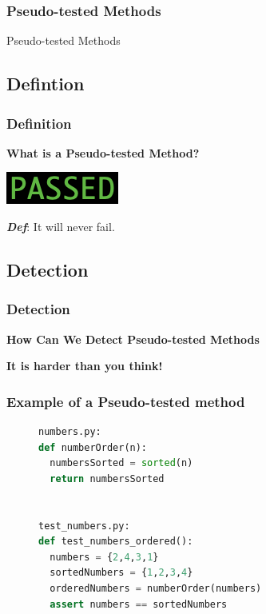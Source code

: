 \begin{frame}
	\frametitle{Pseudo-tested Methods}
	\begin{center}
    \huge{Pseudo-tested Methods}
  \end{center}
\end{frame}

\subsection{Defintion}
\begin{frame}
  \frametitle{Definition}
    \begin{center}
      \textbf{What is a Pseudo-tested Method?}

      \vspace{10mm}
      \includegraphics{images/passing}

      \vspace{10mm}
      \textbf{\textit{Def}}: It will never fail.
    \end{center}
\end{frame}

\subsection{Detection}
\begin{frame}
  \frametitle{Detection}
    \begin{center}
      \textbf{How Can We Detect Pseudo-tested Methods}

			\vspace{20mm}
			\textbf{It is harder than you think!}

    \end{center}
\end{frame}

\begin{frame}[fragile]
\frametitle{Example of a Pseudo-tested method}
	\begin{figure}[t!, scale = .75]
	\begin{lstlisting}[language = Python, basicstyle=\small, backgroundcolor = \color{lightgray}]
numbers.py:
def numberOrder(n):
  numbersSorted = sorted(n)
  return numbersSorted


test_numbers.py:
def test_numbers_ordered():
  numbers = {2,4,3,1}
  sortedNumbers = {1,2,3,4}
  orderedNumbers = numberOrder(numbers)
  assert numbers == sortedNumbers
	\end{lstlisting}
	\end{figure}
\end{frame}

